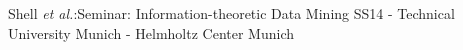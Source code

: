 \documentclass[12pt,journal,compsoc]{IEEEtran}
\numberwithin{equation}{section}
\begin{document}
%
{Shell \MakeLowercase{\textit{et al.}}:Seminar: Information-theoretic Data Mining SS14 - Technical University Munich - Helmholtz Center Munich}
% 






\end{document}
